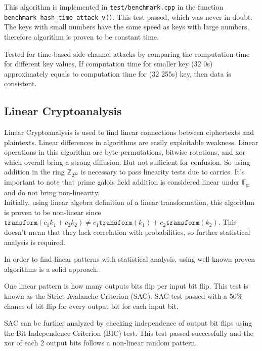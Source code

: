 \documentclass[11pt]{article}
\theoremstyle{definition}
\theoremstyle{remark}
\begin{document}
This algorithm is implemented in \texttt{test/benchmark.cpp} in the function \texttt{benchmark\_hash\_time\_attack\_v()}. This test passed, which was never in doubt. The keys with small numbers have the same speed as keys with large numbers, therefore algorithm is proven to be constant time.

Tested for time-based side-channel attacks by comparing the computation time for different key values, If computation time for smaller key (32 0s) approximately equals to computation time for (32 255s) key, then data is consistent.

\subsection{Linear Cryptoanalysis} \label{lin}

Linear Cryptoanalysis is used to find linear connections between ciphertexts and plaintexts. Linear differences in algorithms are easily exploitable weakness. Linear operations in this algorithm are byte-permutations, bitwise rotations, and xor which overall bring a strong diffusion. But not sufficient for confusion. So using addition in the ring $\mathbb{Z}_{2^{32}}$ is necessary to pass linearity tests due to carries. It's important to note that prime galois field addition is considered linear under $\mathbb{F_p}$ and do not bring  non-linearity.
\\
Initially, using linear algebra definition of a linear transformation, this algorithm is proven to be non-linear since $\texttt{transform}(c_1k_1 + c_2k_2) \neq c_1\texttt{transform}(k_1) + c_2\texttt{transform}(k_2)$. This doesn't mean that they lack correlation with probabilities, so further statistical analysis is required.

In order to find linear patterns with statistical analysis, using well-known proven algorithms is a solid approach.

One linear pattern is how many outputs bits flip per input bit flip. This test is known as the Strict Avalanche Criterion (SAC). SAC test passed with a 50\% chance of bit flip for every output bit for each input bit.

SAC can be further analyzed by checking independence of output bit flips using the Bit Independence Criterion (BIC) test. This test passed successfully and the xor of each 2 output bits follows a non-linear random pattern.
\end{document}
